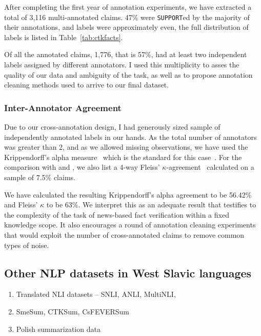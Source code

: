 After completing the first year of annotation experiments, we have extracted a total of 3,116 multi-annotated claims.
47\% were \texttt{SUPPORT}ed by the majority of their annotations, \REF{} and \NEI{} labels were approximately even, the full distribution of labels is listed in Table~\ref{tab:ctkfacts}.

Of all the annotated claims, 1,776, that is 57\%, had at least two independent labels assigned by different annotators.
I used this multiplicity to asses the quality of our data and ambiguity of the task, as well as to propose annotation cleaning methods used to arrive to our final  \CTK dataset.

\subsubsection{Inter-Annotator Agreement}
\label{sec:agreement}

Due to our cross-annotation design, I had generously sized sample of independently annotated labels in our hands.
As the total number of annotators was greater than 2, and as we allowed missing observations, we have used the Krippendorff's alpha measure~\cite{krippendorff1970} which is the standard for this case~\cite{hayes2007krippendorff}.
For the comparison with \cite{fever} and \cite{norregaard2021danfever}, we also list a 4-way Fleiss' $\kappa$-agreement~\cite{fleiss1971measuring} calculated on a sample of 7.5\% claims.

We have calculated the resulting Krippendorff's alpha agreement to be 56.42\% and Fleiss' $\kappa$ to be 63\%.
We interpret this as an adequate result that testifies to the complexity of the task of news-based fact verification within a fixed knowledge scope.
It also encourages a round of annotation cleaning experiments that would exploit the number of cross-annotated claims to remove common types of noise.

\subsection{Other NLP datasets in West Slavic languages}
\begin{enumerate}
    \item {\techbf Translated NLI datasets} -- SNLI, ANLI, MultiNLI, 
    \item SmeSum, CTKSum, CsFEVERSum
    \item Polish summarization data
\end{enumerate}
